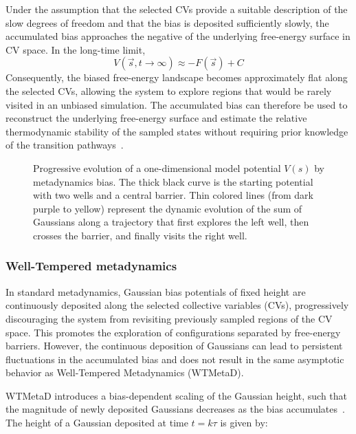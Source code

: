 Under the assumption that the selected CVs provide a suitable description of the slow degrees of freedom and that the bias is deposited sufficiently slowly, the accumulated bias approaches the negative of the underlying free-energy surface in CV space. In the long-time limit,
\begin{equation}
V(\vec{s},t\rightarrow\infty)
\approx
-F(\vec{s}) + C
\end{equation}
Consequently, the biased free-energy landscape becomes approximately flat along the selected CVs, allowing the system to explore regions that would be rarely visited in an unbiased simulation. The accumulated bias can therefore be used to reconstruct the underlying free-energy surface and estimate the relative thermodynamic stability of the sampled states without requiring prior knowledge of the transition pathways~\cite{termo_metad_presion}.

\begin{figure}[!htbp]
    \centering
    
    \caption{Progressive evolution of a one-dimensional model potential $V(s)$ by metadynamics bias. The thick black curve is the starting potential with two wells and a central barrier. Thin colored lines (from dark purple to yellow) represent the dynamic evolution of the sum of Gaussians along a trajectory that first explores the left well, then crosses the barrier, and finally visits the right well.}
    \label{fig:metad}
\end{figure}




\subsubsection{Well-Tempered metadynamics}

In standard metadynamics, Gaussian bias potentials of fixed height are continuously deposited along the selected collective variables (CVs), progressively discouraging the system from revisiting previously sampled regions of the CV space. This promotes the exploration of configurations separated by free-energy barriers. However, the continuous deposition of Gaussians can lead to persistent fluctuations in the accumulated bias and does not result in the same asymptotic behavior as Well-Tempered Metadynamics (WTMetaD).

WTMetaD introduces a bias-dependent scaling of the Gaussian height, such that the magnitude of newly deposited Gaussians decreases as the bias accumulates~\cite{Barducci2008}. The height of a Gaussian deposited at time $t=k\tau$ is given by:

